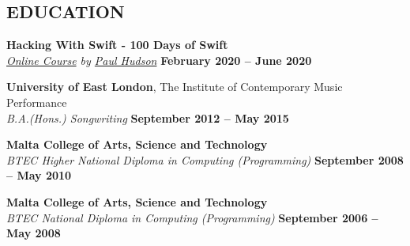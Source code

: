 \documentclass[margin,line]{resume}
\begin{document}
\begin{resume}
\sectionline
    \section{\mysidestyle \textbf{\large{E}\small{DUCATION}}}
        
     \textbf{\listing Hacking With Swift - 100 Days of Swift}  \vspace{1mm}\\
    \textsl{\href{https://www.hackingwithswift.com/100}{Online Course} by \href{https://twitter.com/twostraws}{Paul Hudson}} \hfill \textbf{February 2020 -- June 2020}\vspace{-3mm}\\\vspace{-2mm}%
    
    \textbf{\listing University of East London}, The Institute of Contemporary Music Performance \vspace{1mm}\\
    \textsl{B.A.(Hons.) Songwriting} \hfill \textbf{September 2012 -- May 2015}\vspace{-3mm}\\\vspace{-1mm}%
    
    \textbf{\listing Malta College of Arts, Science and Technology} \vspace{1mm}\\
    \textsl{BTEC Higher National Diploma in Computing (Programming)} \hfill \textbf{September 2008 -- May 2010}\vspace{-3mm}\\\vspace{-1mm}%
    
     \textbf{\listing Malta College of Arts, Science and Technology} \vspace{1mm}\\
    \textsl{BTEC National Diploma in Computing (Programming)} \hfill \textbf{September 2006 -- May 2008}\vspace{-3mm}\\\vspace{-1mm}%

    \vspace{-1mm}
    
\sectionline


\end{resume}
\end{document}

